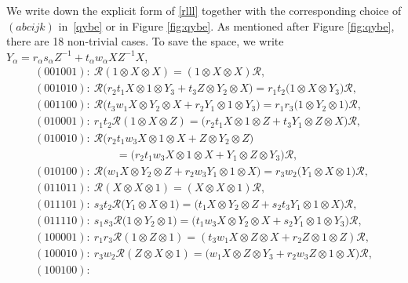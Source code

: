 \documentclass[pdftex]{sigma}
\numberwithin{equation}{section}
\begin{document}
We write down the explicit form of \eqref{rlll} together with
the corresponding choice of $(abcijk)$ in~\eqref{qybe} or in Figure \ref{fig:qybe}.
As mentioned after Figure \ref{fig:qybe}, there are 18 non-trivial cases.
To save the space, we write
$Y_\alpha = r_\alpha s_\alpha Z^{-1}+ t_\alpha w_\alpha XZ^{-1}X$,
\begin{gather}
(001001)\colon\
 \mathscr{R}(1\otimes X\otimes X) = (1\otimes X \otimes X)\mathscr{R},
\label{d1}\\
(001010)\colon\ \mathscr{R}\bigl(
r_2t_1X \otimes 1 \otimes Y_3
+t_3Z\otimes Y_2 \otimes X\bigr) = r_1t_2\bigl( 1 \otimes X \otimes Y_3\bigr)\mathscr{R},
\label{d2}\\
(001100)\colon\ \mathscr{R}\bigl(
t_3w_1X \otimes Y_2\otimes X
+r_2 Y_1 \otimes 1 \otimes Y_3\bigr)
= r_1r_3\bigl(1 \otimes Y_2 \otimes 1\bigr)\mathscr{R},
\label{d3}\\
(010001)\colon\
r_1t_2\mathscr{R}(1 \otimes X \otimes Z) =
\bigl(r_2t_1X \otimes 1 \otimes Z
+ t_3Y_1 \otimes Z\otimes X \bigr)\mathscr{R},
\label{d4}\\
(010010)\colon\ \mathscr{R}\bigl(
r_2t_1w_3 X \otimes 1 \otimes X + Z \otimes Y_2 \otimes Z\bigr)\nonumber\\
\phantom{(101101)\colon\ }{}\qquad
= \bigl(
r_2t_1w_3 X \otimes 1 \otimes X
+Y_1 \otimes Z \otimes Y_3
\bigr)\mathscr{R},
\label{d5}\\
(010100)\colon\ \mathscr{R}\bigl(
w_1 X \otimes Y_2 \otimes Z
+ r_2w_3Y_1\otimes 1 \otimes X\bigr)
= r_3w_2 \bigl(Y_1 \otimes X \otimes 1\bigr) \mathscr{R},
\label{d6}\\
(011011)\colon\
 \mathscr{R}(X \otimes X \otimes 1) = (X \otimes X \otimes 1)\mathscr{R},
\label{d7}\\
(011101)\colon\ s_3t_2 \mathscr{R}\bigl(
Y_1\otimes X \otimes 1\bigr)
= \bigl(
t_1X \otimes Y_2 \otimes Z
+ s_2t_3 Y_1\otimes 1 \otimes X
\bigr)\mathscr{R},
\label{d8}\\
(011110)\colon\
 s_1s_3 \mathscr{R}\bigl(
1 \otimes Y_2 \otimes 1\bigr)
= \bigl(t_1w_3 X \otimes Y_2 \otimes X
+s_2Y_1\otimes 1 \otimes Y_3
\bigr)\mathscr{R},
\label{d9}\\
(100001)\colon\
 r_1r_3 \mathscr{R}(1\otimes Z \otimes 1) = (t_3w_1 X \otimes Z \otimes X +r_2 Z \otimes 1 \otimes Z)\mathscr{R},
\label{d10}\\
(100010)\colon\
 r_3w_2\mathscr{R}(Z \otimes X \otimes 1)
=\bigl( w_1 X \otimes Z \otimes Y_3
+ r_2w_3 Z \otimes 1 \otimes X\bigr)\mathscr{R},
\label{d11}\\
(100100)\colon\

\end{gather}
\end{document}
